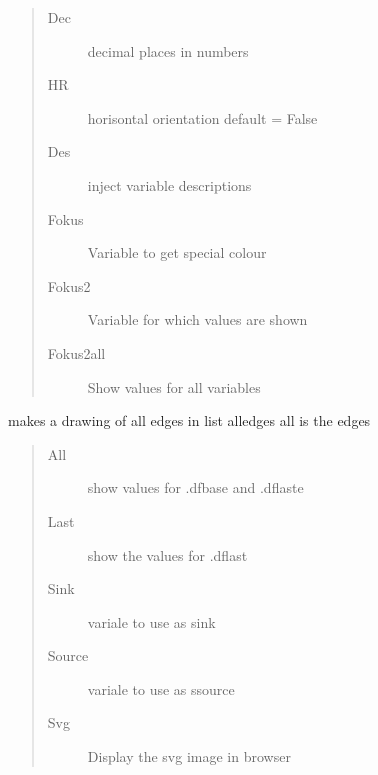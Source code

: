 \documentclass[letterpaper,10pt,english]{sphinxmanual}
\begin{document}
\begin{fulllineitems}
\begin{fulllineitems}
\begin{quote}
\begin{description}
\item[{Dec}] \leavevmode
\sphinxAtStartPar
decimal places in numbers

\item[{HR}] \leavevmode
\sphinxAtStartPar
horisontal orientation default = False

\item[{Des}] \leavevmode
\sphinxAtStartPar
inject variable descriptions

\item[{Fokus}] \leavevmode
\sphinxAtStartPar
Variable to get special colour

\item[{Fokus2}] \leavevmode
\sphinxAtStartPar
Variable for which values are shown

\item[{Fokus2all}] \leavevmode
\sphinxAtStartPar
Show values for all variables

\end{description}\end{quote}

\end{fulllineitems}


\begin{fulllineitems}
\label{\detokenize{index:modelclass.Graph_Draw_Mixin.todot2}}
\pysigstartsignatures
{}
\pysigstopsignatures
\sphinxAtStartPar
makes a drawing of all edges in list alledges
all is the edges
\begin{quote}\begin{description}
\item[{All}] \leavevmode
\sphinxAtStartPar
show values for .dfbase and .dflaste

\item[{Last}] \leavevmode
\sphinxAtStartPar
show the values for .dflast

\item[{Sink}] \leavevmode
\sphinxAtStartPar
variale to use as sink

\item[{Source}] \leavevmode
\sphinxAtStartPar
variale to use as ssource

\item[{Svg}] \leavevmode
\sphinxAtStartPar
Display the svg image in browser


\end{description}
\end{quote}
\end{fulllineitems}
\end{fulllineitems}
\end{document}
